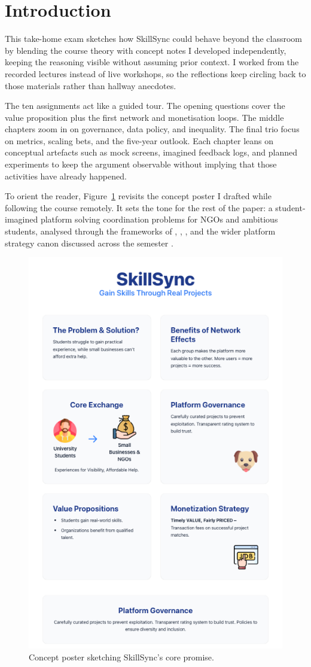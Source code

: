 \documentclass[12pt,a4paper]{article}
\begin{document}
\tableofcontents
\newpage

\section*{Introduction}
This take-home exam sketches how SkillSync could behave beyond the classroom by blending the course theory with concept notes I developed independently, keeping the reasoning visible without assuming prior context. I worked from the recorded lectures instead of live workshops, so the reflections keep circling back to those materials rather than hallway anecdotes.

The ten assignments act like a guided tour. The opening questions cover the value proposition plus the first network and monetisation loops. The middle chapters zoom in on governance, data policy, and inequality. The final trio focus on metrics, scaling bets, and the five-year outlook. Each chapter leans on conceptual artefacts such as mock screens, imagined feedback logs, and planned experiments to keep the argument observable without implying that those activities have already happened.

To orient the reader, Figure~\ref{fig:intro-showcase} revisits the concept poster I drafted while following the course remotely. It sets the tone for the rest of the paper: a student-imagined platform solving coordination problems for NGOs and ambitious students, analysed through the frameworks of \citet{Choudary2016}, \citet{Srnicek2017}, \citet{Reillier2017}, and the wider platform strategy canon discussed across the semester \citep{Lecture01,Lecture03,Lecture05}.

\begin{figure}[H]
  \centering
  \includegraphics[width=0.7\linewidth]{figures/Poster.png}
  \caption{Concept poster sketching SkillSync's core promise.}
  \label{fig:intro-showcase}
\end{figure}
\end{document}
